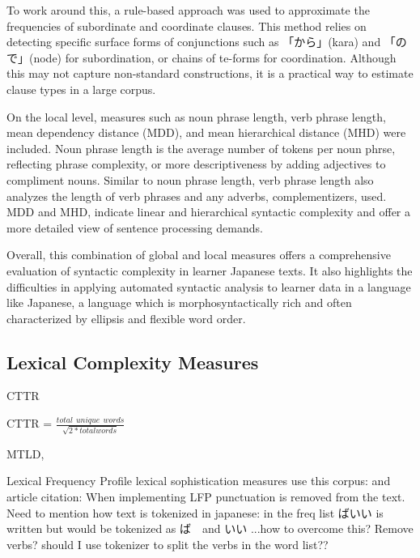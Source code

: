 To work around this, a rule-based approach was used to approximate the frequencies of subordinate and coordinate
clauses. This method relies on detecting specific surface forms of conjunctions such as 「から」(kara) and 「ので」(node)
for subordination, or chains of te-forms for coordination. Although this may not capture non-standard constructions,
it is a practical way to estimate clause types in a large corpus.

On the local level, measures such as noun phrase length, verb phrase length, mean dependency distance (MDD), and mean
hierarchical
distance (MHD) were included. Noun phrase length is the average number of tokens per noun phrse, reflecting phrase
complexity, or more descriptiveness by adding adjectives to compliment nouns.  Similar to noun phrase length, verb
phrase length also analyzes the length of verb phrases and any adverbs, complementizers, used.  MDD and MHD,
indicate linear and hierarchical syntactic complexity and offer a more detailed view of sentence processing demands.

Overall, this combination of global and local measures offers a comprehensive evaluation of syntactic complexity in
learner
Japanese texts. It also highlights the difficulties in applying automated syntactic analysis to learner data in a
language like Japanese, a language which is morphosyntactically rich and often characterized by  ellipsis and
flexible word order.

\subsection{Lexical Complexity Measures}
CTTR

\begin{center}
    \centering CTTR = ${\displaystyle \frac{total \hspace{5pt} unique\hspace{5pt} words}{\sqrt{2*total words}} } $
    \end{center}
\vspace{5pt} 

MTLD,

Lexical Frequency Profile
lexical sophistication measures use this corpus: \cite{BCCWJ_List} and article citation: \cite{maekawa2014}
When implementing LFP punctuation is removed from the text. Need to mention how text is tokenized in japanese: in
the freq list ばいい is written but would be tokenized as ば　and いい ...how to overcome this? Remove verbs? should I use
tokenizer to split the verbs in the word list??


